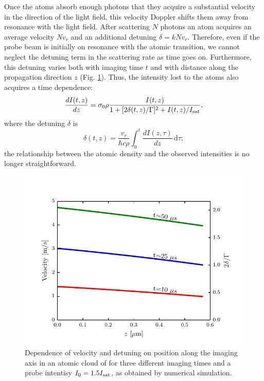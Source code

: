 \documentclass[12pt]{iopart}
\begin{document}
\par Once the atoms absorb enough photons that they acquire a substantial velocity in the direction of the light field, this velocity Doppler shifts them away from resonance with the light field. After scattering $N$ photons an atom acquires an average velocity $N v_r$ and an additional detuning $\delta=k N v_r$. Therefore, even if the probe beam is initially on resonance with the atomic transition, we cannot neglect the detuning term in the scattering rate as time goes on. Furthermore, this detuning varies both with imaging time $t$ and with distance along the propagation direction $z$ (Fig. \ref{fig:detunedBlobs}). Thus, the intensity lost to the atoms also acquires a time dependence: 
\begin{equation}
\frac{dI(t,z)}{dz}=\sigma_0 \rho \frac{I(t,z)}{1+[2\delta(t,z)/\Gamma]^2 +I(t,z)/I_{\rm{sat}}}, \label{eq3}
\end{equation}
where the detuning $\delta$ is
\begin{equation}
\delta(t,z)=\frac{v_r}{\hbar c \rho}\int_0^t \frac{dI(z,\tau)}{dz}\,\mathrm{d}\tau; \label{eq4} 
\end{equation}
the relationship between the atomic density and the observed intensities is no longer straightforward.
\begin{figure}
	\includegraphics*{Figure1.pdf}
\caption{Dependence of velocity and detuning on position along the imaging axis in an atomic cloud of \K{} for three different imaging times and a probe intentisy $I_0=1.5 I_{\rm{sat}}$, as obtained by numerical simulation.}  
\label{fig:detunedBlobs}
\end{figure}
\end{document}
